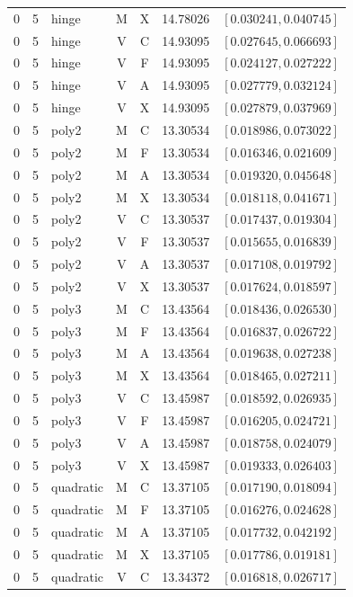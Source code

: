 \begin{longtable}{r r l c c r l}
0 & 5 & hinge & M & X & 14.78026 & $[0.030241,0.040745]$ \\
0 & 5 & hinge & V & C & 14.93095 & $[0.027645,0.066693]$ \\
0 & 5 & hinge & V & F & 14.93095 & $[0.024127,0.027222]$ \\
0 & 5 & hinge & V & A & 14.93095 & $[0.027779,0.032124]$ \\
0 & 5 & hinge & V & X & 14.93095 & $[0.027879,0.037969]$ \\
0 & 5 & poly2 & M & C & 13.30534 & $[0.018986,0.073022]$ \\
0 & 5 & poly2 & M & F & 13.30534 & $[0.016346,0.021609]$ \\
0 & 5 & poly2 & M & A & 13.30534 & $[0.019320,0.045648]$ \\
0 & 5 & poly2 & M & X & 13.30534 & $[0.018118,0.041671]$ \\
0 & 5 & poly2 & V & C & 13.30537 & $[0.017437,0.019304]$ \\
0 & 5 & poly2 & V & F & 13.30537 & $[0.015655,0.016839]$ \\
0 & 5 & poly2 & V & A & 13.30537 & $[0.017108,0.019792]$ \\
0 & 5 & poly2 & V & X & 13.30537 & $[0.017624,0.018597]$ \\
0 & 5 & poly3 & M & C & 13.43564 & $[0.018436,0.026530]$ \\
0 & 5 & poly3 & M & F & 13.43564 & $[0.016837,0.026722]$ \\
0 & 5 & poly3 & M & A & 13.43564 & $[0.019638,0.027238]$ \\
0 & 5 & poly3 & M & X & 13.43564 & $[0.018465,0.027211]$ \\
0 & 5 & poly3 & V & C & 13.45987 & $[0.018592,0.026935]$ \\
0 & 5 & poly3 & V & F & 13.45987 & $[0.016205,0.024721]$ \\
0 & 5 & poly3 & V & A & 13.45987 & $[0.018758,0.024079]$ \\
0 & 5 & poly3 & V & X & 13.45987 & $[0.019333,0.026403]$ \\
0 & 5 & quadratic & M & C & 13.37105 & $[0.017190,0.018094]$ \\
0 & 5 & quadratic & M & F & 13.37105 & $[0.016276,0.024628]$ \\
0 & 5 & quadratic & M & A & 13.37105 & $[0.017732,0.042192]$ \\
0 & 5 & quadratic & M & X & 13.37105 & $[0.017786,0.019181]$ \\
0 & 5 & quadratic & V & C & 13.34372 & $[0.016818,0.026717]$ \\

\end{longtable}
